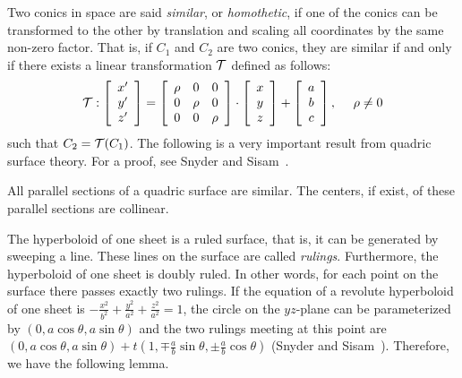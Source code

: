      Two conics in space are said {\em similar}, or {\em homothetic}, if one 
of the conics can be transformed to the other by translation and scaling all 
coordinates by the same non-zero factor.  That is, if $C_1$ and $C_2$ are 
two conics, they are similar if and only if there exists a linear 
transformation ${\cal T}$ defined as follows:
\[ {\cal T} : \left[ \begin{array}{c}
                    x^\prime \\ y^\prime \\ z^\prime
              \end{array} \right] =
       \left[ \begin{array}{ccc}
                    \rho &   0   &   0    \\
                      0  & \rho  &   0    \\
                      0  &   0   & \rho  
              \end{array} \right] \cdot
       \left[ \begin{array}{c}
                    x \\ y \\ z
              \end{array} \right] +
       \left[ \begin{array}{c}
                    a \\ b \\ c
              \end{array} \right],\ \ \ \ \rho\neq 0  \]
such that $C_2={\cal T}(C_1)$.  The following is a very important result
from quadric surface theory. 
For a proof, see Snyder and Sisam~\cite{snyder-sisam:1914}.

\begin{lemma}
\label{lemma:similar}
     All parallel sections of a quadric surface are similar.  The centers, if
exist, of these parallel sections are collinear.
\end{lemma}

     The hyperboloid of one sheet is a ruled surface, that is, it can be 
generated by sweeping a line.  These lines on the surface are called 
{\em rulings}.  Furthermore, the hyperboloid of one sheet is doubly ruled.  
In other words, for each point on the surface there passes exactly two rulings.
If the equation of a revolute hyperboloid of one sheet 
is $-\frac{x^2}{b^2}+\frac{y^2}{a^2}+\frac{z^2}{a^2}=1$, the circle on the
$yz$-plane can be parameterized by $(0,a\cos\theta,a\sin\theta)$ and the two
rulings meeting at this point are $(0,a\cos\theta,a\sin\theta)+
t\left(1,\mp\frac{a}{b}\sin\theta,\pm\frac{a}{b}\cos\theta\right)$
(Snyder and Sisam~\cite{snyder-sisam:1914}).  Therefore, we have the following
lemma.

